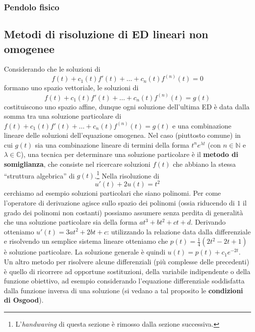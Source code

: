\documentclass[a4paper,twoside]{article}
\newcommand{\N}{\mathbb{N}}
\newcommand{\C}{\mathbb{C}}
\theoremstyle{definition}
\numberwithin{theorem}{section}
\begin{document}
\subsubsection{Pendolo fisico}

\subsection{Metodi di risoluzione di ED lineari non omogenee}

Considerando che le soluzioni di 
$$ f(t) + c_1(t) f'(t) + \ldots + c_n(t) f^{(n)}(t) = 0 $$
formano uno spazio vettoriale, le soluzioni di 
$$ f(t) + c_1(t) f'(t) + \ldots + c_n(t) f^{(n)}(t) = g(t) $$
costituiscono uno spazio affine, dunque ogni soluzione dell'ultima ED è data dalla somma tra una soluzione particolare di $ f(t) + c_1(t) f'(t) + \ldots + c_n(t) f^{(n)}(t) = g(t) $ e una combinazione lineare delle soluzioni dell'equazione omogenea. Nel caso (piuttosto comune) in cui $g(t)$ sia una combinazione lineare di termini della forma $t^n e^{\lambda t}$ (con $n\in\N$ e $\lambda\in\C$), una tecnica per determinare una soluzione particolare è il \textbf{metodo di somiglianza}, che consiste nel ricercare soluzioni $f(t)$ che abbiano la stessa ``struttura algebrica'' di $g(t)$.\footnote{L'\emph{handwaving} di questa sezione è rimosso dalla sezione successiva.} Nella risoluzione di  
$$ u'(t)+2u(t) = t^2$$
cerchiamo ad esempio soluzioni particolari che siano polinomi. Per come l'operatore di derivazione agisce sullo spazio dei polinomi (ossia riducendo di $1$ il grado dei polinomi non costanti) possiamo assumere senza perdita di generalità che una soluzione particolare sia della forma $at^3+bt^2+ct+d$.  Derivando otteniamo $u'(t)=3at^2+2bt+c$: utilizzando la relazione data dalla differenziale e risolvendo un semplice sistema lineare otteniamo che $p(t)=\frac{1}{4}(2t^2-2t+1)$ è soluzione particolare.
La soluzione generale è quindi $u(t)= p(t) + c_1 e^{-2t}$.\\
Un altro metodo per risolvere alcune differenziali (più complesse delle precedenti) 
è quello di ricorrere ad opportune sostituzioni, della variabile indipendente o della funzione obiettivo, ad esempio considerando l'equazione differenziale soddisfatta dalla funzione inversa di una soluzione (si vedano a tal proposito le \textbf{condizioni di Osgood}).
\end{document}
